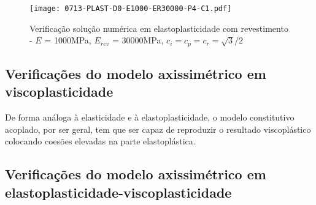 \begin{figure}[H]
	\begin{center}
		\texttt{[image: 0713-PLAST-D0-E1000-ER30000-P4-C1.pdf]}
	\end{center}
	\caption{\label{PLAST-D0-E1000-ER30000-P4-C1}Verificação solução numérica em elastoplasticidade com revestimento - $E$ = 1000MPa, $E_{rev}$ = 30000MPa, $c_i=c_p=c_r=\sqrt{3}/2$}
\end{figure}

\subsection{Verificações do modelo axissimétrico em viscoplasticidade}

De forma análoga à elasticidade e à elastoplasticidade, o modelo constitutivo acoplado, por ser geral, tem que ser capaz de reproduzir o resultado viscoplástico colocando coesões elevadas na parte elastoplástica. 

\subsection{Verificações do modelo axissimétrico em elastoplasticidade-viscoplasticidade}